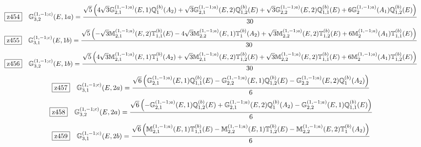 \documentclass[fleqn,10pt,landscape]{jsarticle}
\begin{document}
\begin{dmath*}
\hspace*{3mm}\fbox{z454}\quad \mathbb{G}_{3,2}^{(1,-1;c)}(E,1a)=\frac{\sqrt{5} \left(4 \sqrt{3} \mathbb{G}_{2,1}^{(1,-1;a)}(E,1) \mathbb{Q}_{1}^{(b)}(A_{2}) + \sqrt{3} \mathbb{G}_{2,1}^{(1,-1;a)}(E,2) \mathbb{Q}_{1,2}^{(b)}(E) + \sqrt{3} \mathbb{G}_{2,2}^{(1,-1;a)}(E,2) \mathbb{Q}_{1,1}^{(b)}(E) + 6 \mathbb{G}_{2}^{(1,-1;a)}(A_{1}) \mathbb{Q}_{1,2}^{(b)}(E)\right)}{30}
\end{dmath*}
\begin{dmath*}
\hspace*{3mm}\fbox{z455}\quad \mathbb{G}_{3,1}^{(1,-1;c)}(E,1b)=\frac{\sqrt{5} \left(- \sqrt{3} \mathbb{M}_{2,1}^{(1,-1;a)}(E,2) \mathbb{T}_{1,1}^{(b)}(E) - 4 \sqrt{3} \mathbb{M}_{2,2}^{(1,-1;a)}(E,1) \mathbb{T}_{1}^{(b)}(A_{2}) + \sqrt{3} \mathbb{M}_{2,2}^{(1,-1;a)}(E,2) \mathbb{T}_{1,2}^{(b)}(E) + 6 \mathbb{M}_{2}^{(1,-1;a)}(A_{1}) \mathbb{T}_{1,1}^{(b)}(E)\right)}{30}
\end{dmath*}
\begin{dmath*}
\hspace*{3mm}\fbox{z456}\quad \mathbb{G}_{3,2}^{(1,-1;c)}(E,1b)=\frac{\sqrt{5} \left(4 \sqrt{3} \mathbb{M}_{2,1}^{(1,-1;a)}(E,1) \mathbb{T}_{1}^{(b)}(A_{2}) + \sqrt{3} \mathbb{M}_{2,1}^{(1,-1;a)}(E,2) \mathbb{T}_{1,2}^{(b)}(E) + \sqrt{3} \mathbb{M}_{2,2}^{(1,-1;a)}(E,2) \mathbb{T}_{1,1}^{(b)}(E) + 6 \mathbb{M}_{2}^{(1,-1;a)}(A_{1}) \mathbb{T}_{1,2}^{(b)}(E)\right)}{30}
\end{dmath*}
\begin{dmath*}
\hspace*{3mm}\fbox{z457}\quad \mathbb{G}_{3,1}^{(1,-1;c)}(E,2a)=\frac{\sqrt{6} \left(\mathbb{G}_{2,1}^{(1,-1;a)}(E,1) \mathbb{Q}_{1,1}^{(b)}(E) - \mathbb{G}_{2,2}^{(1,-1;a)}(E,1) \mathbb{Q}_{1,2}^{(b)}(E) - \mathbb{G}_{2,2}^{(1,-1;a)}(E,2) \mathbb{Q}_{1}^{(b)}(A_{2})\right)}{6}
\end{dmath*}
\begin{dmath*}
\hspace*{3mm}\fbox{z458}\quad \mathbb{G}_{3,2}^{(1,-1;c)}(E,2a)=\frac{\sqrt{6} \left(- \mathbb{G}_{2,1}^{(1,-1;a)}(E,1) \mathbb{Q}_{1,2}^{(b)}(E) + \mathbb{G}_{2,1}^{(1,-1;a)}(E,2) \mathbb{Q}_{1}^{(b)}(A_{2}) - \mathbb{G}_{2,2}^{(1,-1;a)}(E,1) \mathbb{Q}_{1,1}^{(b)}(E)\right)}{6}
\end{dmath*}
\begin{dmath*}
\hspace*{3mm}\fbox{z459}\quad \mathbb{G}_{3,1}^{(1,-1;c)}(E,2b)=\frac{\sqrt{6} \left(\mathbb{M}_{2,1}^{(1,-1;a)}(E,1) \mathbb{T}_{1,1}^{(b)}(E) - \mathbb{M}_{2,2}^{(1,-1;a)}(E,1) \mathbb{T}_{1,2}^{(b)}(E) - \mathbb{M}_{2,2}^{(1,-1;a)}(E,2) \mathbb{T}_{1}^{(b)}(A_{2})\right)}{6}
\end{dmath*}
\end{document}
